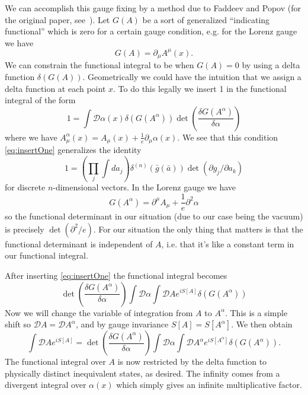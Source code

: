 We can accomplish this gauge fixing by a method due to Faddeev
and Popov (for the original paper,
see~\cite{Faddeev:1967fc}). Let $G(A)$ be a sort of generalized
``indicating functional'' which is zero for a certain gauge
condition, e.g. for the Lorenz gauge we have 
\begin{equation}%
G(A)=\partial_{\mu}A^{\mu}(x).
\end{equation} 
We can constrain the functional integral to be when $G(A)=0$ by
using a delta function $\delta\left(G(A)\right)$. Geometrically
we could have the intuition that we assign a delta function at
each point $x$. To do this legally we insert 1 in the functional
integral of the form
\begin{equation}\label{eq:insertOne}
1 = \int \mathcal{D}\alpha(x)
\delta\left(G(A^{\alpha})\right)\det\left(\frac{\delta
  G(A^{\alpha})}{\delta \alpha}\right)
\end{equation}
where we have $A^{\alpha}_{\mu}(x) = A_{\mu}(x) +
\frac{1}{e}\partial_{\mu}\alpha(x)$. We see that this condition
\eqref{eq:insertOne} generalizes the identity
\begin{equation}%
1 = \left(\prod_{j}\int d a_{j}\right)
\delta^{(n)}(\bar{g}(\bar{a}))\det(\partial g_{j}/\partial a_{k})
\end{equation}
for discrete $n$-dimensional vectors. In the Lorenz gauge we have 
\begin{equation}%
G(A^{\alpha}) = \partial^{\mu}A_{\mu} + \frac{1}{e}\partial^{2}\alpha
\end{equation}
so the functional determinant in our situation (due to our case
being the vacuum) is precisely $\det(\partial^{2}/e)$. For our
situation the only  thing that matters is that the functional
determinant is independent of $A$, i.e. that it's like a constant
term in our functional integral.

After inserting \eqref{eq:insertOne} the functional integral
becomes
\begin{equation}%
\det\left(\frac{\delta G(A^{\alpha})}{\delta \alpha}\right)\int
\mathcal{D}\alpha\int\mathcal{D}A e^{iS[A]}\delta\left(G(A^{\alpha})\right)
\end{equation}
Now we will change the variable of integration from $A$ to
$A^{\alpha}$. This is a simple shift so
$\mathcal{D}A=\mathcal{D}A^{\alpha}$, and by gauge invariance
$S[A]=S[A^{\alpha}]$. We then obtain
\begin{equation}%
\int\mathcal{D}A e^{iS[A]} = \det\left(\frac{\delta G(A^{\alpha})}{\delta \alpha}\right)\int
\mathcal{D}\alpha\int\mathcal{D}A^{\alpha} e^{iS[A^{\alpha}]}\delta\left(G(A^{\alpha})\right).
\end{equation}
The functional integral over $A$ is now restricted by the delta
function to physically distinct inequivalent states, as
desired. The infinity comes from a divergent integral over
$\alpha(x)$ which simply gives an infinite multiplicative factor.

